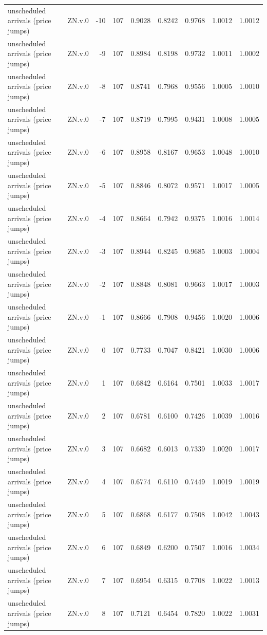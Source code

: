 \begin{tabular}{llrrrrrrr}
unscheduled arrivals (price jumps) & ZN.v.0 & -10 & 107 & 0.9028 & 0.8242 & 0.9768 & 1.0012 & 1.0012 \\
unscheduled arrivals (price jumps) & ZN.v.0 & -9 & 107 & 0.8984 & 0.8198 & 0.9732 & 1.0011 & 1.0002 \\
unscheduled arrivals (price jumps) & ZN.v.0 & -8 & 107 & 0.8741 & 0.7968 & 0.9556 & 1.0005 & 1.0010 \\
unscheduled arrivals (price jumps) & ZN.v.0 & -7 & 107 & 0.8719 & 0.7995 & 0.9431 & 1.0008 & 1.0005 \\
unscheduled arrivals (price jumps) & ZN.v.0 & -6 & 107 & 0.8958 & 0.8167 & 0.9653 & 1.0048 & 1.0010 \\
unscheduled arrivals (price jumps) & ZN.v.0 & -5 & 107 & 0.8846 & 0.8072 & 0.9571 & 1.0017 & 1.0005 \\
unscheduled arrivals (price jumps) & ZN.v.0 & -4 & 107 & 0.8664 & 0.7942 & 0.9375 & 1.0016 & 1.0014 \\
unscheduled arrivals (price jumps) & ZN.v.0 & -3 & 107 & 0.8944 & 0.8245 & 0.9685 & 1.0003 & 1.0004 \\
unscheduled arrivals (price jumps) & ZN.v.0 & -2 & 107 & 0.8848 & 0.8081 & 0.9663 & 1.0017 & 1.0003 \\
unscheduled arrivals (price jumps) & ZN.v.0 & -1 & 107 & 0.8666 & 0.7908 & 0.9456 & 1.0020 & 1.0006 \\
unscheduled arrivals (price jumps) & ZN.v.0 & 0 & 107 & 0.7733 & 0.7047 & 0.8421 & 1.0030 & 1.0006 \\
unscheduled arrivals (price jumps) & ZN.v.0 & 1 & 107 & 0.6842 & 0.6164 & 0.7501 & 1.0033 & 1.0017 \\
unscheduled arrivals (price jumps) & ZN.v.0 & 2 & 107 & 0.6781 & 0.6100 & 0.7426 & 1.0039 & 1.0016 \\
unscheduled arrivals (price jumps) & ZN.v.0 & 3 & 107 & 0.6682 & 0.6013 & 0.7339 & 1.0020 & 1.0017 \\
unscheduled arrivals (price jumps) & ZN.v.0 & 4 & 107 & 0.6774 & 0.6110 & 0.7449 & 1.0019 & 1.0019 \\
unscheduled arrivals (price jumps) & ZN.v.0 & 5 & 107 & 0.6868 & 0.6177 & 0.7508 & 1.0042 & 1.0043 \\
unscheduled arrivals (price jumps) & ZN.v.0 & 6 & 107 & 0.6849 & 0.6200 & 0.7507 & 1.0016 & 1.0034 \\
unscheduled arrivals (price jumps) & ZN.v.0 & 7 & 107 & 0.6954 & 0.6315 & 0.7708 & 1.0022 & 1.0013 \\
unscheduled arrivals (price jumps) & ZN.v.0 & 8 & 107 & 0.7121 & 0.6454 & 0.7820 & 1.0022 & 1.0031 \\

\end{tabular}
